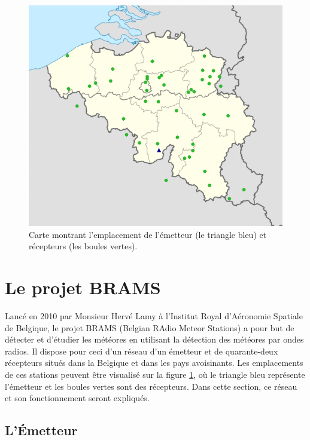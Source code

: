 \documentclass[11pt]{article}
\begin{document}
\newpage

\begin{figure}[t]
    \begin{center}
        \includegraphics[scale=1]{station_map.png}
        \caption{Carte montrant l'emplacement de l'émetteur (le triangle bleu) et récepteurs (les boules vertes).}
        \label{fig:station_map}
    \end{center}
\end{figure}

\section{Le projet BRAMS}

Lancé en 2010 par Monsieur Hervé Lamy à l'Institut Royal d'Aéronomie Spatiale de Belgique, le projet BRAMS (Belgian RAdio Meteor Stations) a pour but de détecter et d'étudier les météores en utilisant la détection des météores par ondes radios.
Il dispose pour ceci d'un réseau d'un émetteur et de quarante-deux récepteurs situés dans la Belgique et dans les pays avoisinants.
Les emplacements de ces stations peuvent être visualisé sur la figure \ref{fig:station_map}, où le triangle bleu représente l'émetteur et les boules vertes sont des récepteurs.
Dans cette section, ce réseau et son fonctionnement seront expliqués.

\subsection{L'Émetteur}
\end{document}
